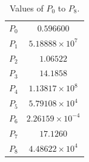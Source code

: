 \begin{table}[h]
	\centering
	\caption[Values of $P_{0}$ to $P_{8}$]{
	Values of $P_{0}$ to $P_{8}$.
	}\label{tab:Calib_water_param}
	\vs
	\begin{tabular}{cc} \hline \hline
		$P_{0}$ & $0.596600$               \\
		$P_{1}$ & $5.18888 \times 10^{7}$  \\
		$P_{2}$ & $1.06522$                \\
		$P_{3}$ & $14.1858$                \\
		$P_{4}$ & $1.13817 \times 10^{8}$  \\
		$P_{5}$ & $5.79108 \times 10^{4}$  \\
		$P_{6}$ & $2.26159 \times 10^{-4}$ \\
		$P_{7}$ & $17.1260$                \\
		$P_{8}$ & $4.48622 \times 10^{4}$  \\ \hline \hline
	\end{tabular}
\end{table}

